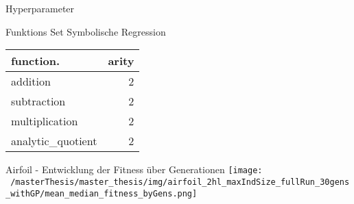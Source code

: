 \documentclass[
  ignorenonframetext,
]{beamer}
\begin{document}
\begin{frame}{Hyperparameter}
\protect\hypertarget{hyperparameter}{}
\begin{table}
\centering\begingroup\fontsize{7}{9}\selectfont

\endgroup{}
\end{table}
\end{frame}

\begin{frame}{Funktions Set Symbolische Regression}
\protect\hypertarget{funktions-set-symbolische-regression}{}
\begin{table}[!h]
\centering
\begin{tabular}{l|r}
\hline
\textbf{function.} & \textbf{arity}\\
\hline
addition & 2\\
\hline
subtraction & 2\\
\hline
multiplication & 2\\
\hline
analytic\_quotient & 2\\
\hline
\end{tabular}
\end{table}
\end{frame}

\begin{frame}{Airfoil - Entwicklung der Fitness über Generationen}
\protect\hypertarget{airfoil---entwicklung-der-fitness-uxfcber-generationen}{}
\texttt{[image: ~/masterThesis/master\_thesis/img/airfoil\_2hl\_maxIndSize\_fullRun\_30gens\_withGP/mean\_median\_fitness\_byGens.png]}
\end{frame}
\end{document}

